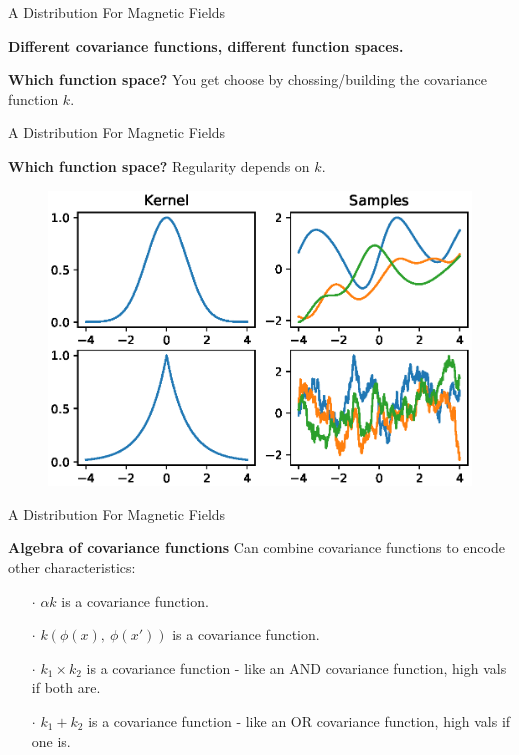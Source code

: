 \documentclass{beamer}
\begin{document}
\begin{frame}{A Distribution For Magnetic Fields}

  \textbf{Different covariance functions, different function spaces.}

  \vspace{1em}

  \textbf{Which function space?} You get choose by chossing/building the covariance function $k$.

\end{frame}



\begin{frame}{A Distribution For Magnetic Fields}

  \textbf{Which function space?} Regularity depends on $k$.

  \begin{figure}
    \includegraphics[width=\linewidth]{plots/regularity.eps}
  \end{figure}

\end{frame}


\begin{frame}{A Distribution For Magnetic Fields}

  \textbf{Algebra of covariance functions} Can combine covariance functions to encode other characteristics:

  \vspace{1em}

  \begin{itemize}
    \setlength\itemsep{1em}
    \item[$\cdot$] $\alpha k$ is a covariance function.
    \item[$\cdot$] $k(\phi(x),\ \phi(x'))$ is a covariance function.
    \item[$\cdot$] $k_1 \times k_2$ is a covariance function - like an AND covariance function, high vals if both are.
    \item[$\cdot$] $k_1 + k_2$ is a covariance function - like an OR covariance function, high vals if one is.
  \end{itemize}

\end{frame}
\end{document}
